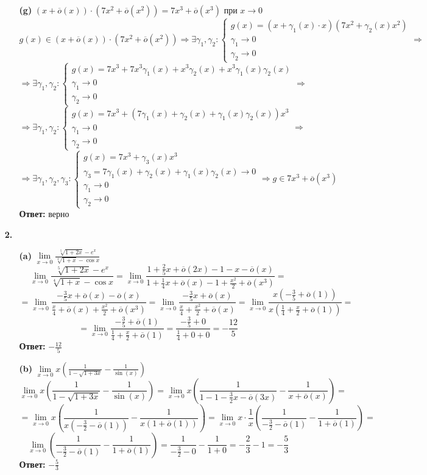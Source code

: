 \documentclass[a4paper]{article}
\renewcommand{\f}[2]{\frac{#1}{#2}}
\newcommand{\case}[1]{\begin{cases} #1 \end{cases}}
\newcommand{\lm}[1]{\underset{#1}{\lim}}
\renewcommand{\r}{\Rightarrow}
\newcommand{\oo}{\overline{o}}
\begin{document}
\begin{enumerate}
\begin{enumerate}
        \item[\textbf{(g)}]$ (x + \oo(x))\cdot (7x^2 + \oo(x^2)) = 7x^3 + \oo(x^3)$ при $x \to 0$
        $$g(x) \in (x + \oo(x))\cdot (7x^2 + \oo(x^2)) \r \exists \gamma_1, \gamma_2 : \case{
            g(x) = (x + \gamma_1(x)\cdot x)(7x^2 + \gamma_2(x)x^2)\\
            \gamma_1 \to 0 \\
            \gamma_2 \to 0
        } \r$$
        $$\r \exists \gamma_1, \gamma_2 : \case{
            g(x) = 7x^3 + 7x^3\gamma_1(x) + x^3\gamma_2(x) +x^3\gamma_1(x)\gamma_2(x) \\
            \gamma_1 \to 0 \\
            \gamma_2 \to 0
        }\r$$
        $$\r \exists \gamma_1, \gamma_2 : \case{
            g(x) = 7x^3 + (7\gamma_1(x) + \gamma_2(x) +\gamma_1(x)\gamma_2(x))x^3\\
            \gamma_1 \to 0 \\
            \gamma_2 \to 0
        }\r$$
        $$\r \exists \gamma_1, \gamma_2, \gamma_3 : \case{
            g(x) = 7x^3 + \gamma_3(x)x^3\\
            \gamma_3 = 7\gamma_1(x) + \gamma_2(x) +\gamma_1(x)\gamma_2(x) \to 0\\
            \gamma_1 \to 0 \\
            \gamma_2 \to 0
        } \r g \in 7x^3 + \oo(x^3)$$
        \textbf{Ответ: } верно\\
    \end{enumerate}
    
    \item[\textbf{2.}]
    \begin{enumerate}
        \item[\textbf{(a)}] $\lm{x\to 0}\f{\sqrt[5]{1+2x}-e^x}{\sqrt[4]{1+x}-\cos x}$
        $$\lm{x\to 0}\f{\sqrt[5]{1+2x}-e^x}{\sqrt[4]{1+x}-\cos x} = \lm{x\to 0}\f{1+\f{2}{5}x+\oo(2x)-1-x-\oo(x)}{1+\f{1}{4}x+\oo(x)-1+\f{x^2}{2}+\oo(x^3)} = $$
        $$ = \lm{x\to 0}\f{-\f{3}{5}x+\oo(x)-\oo(x)}{\f{x}{4}+\oo(x)+\f{x^2}{2}+\oo(x^3)} = \lm{x\to 0}\f{-\f{3}{5}x+\oo(x)}{\f{x}{4}+\f{x^2}{2}+\oo(x)} =\lm{x\to 0}\f{x(-\f{3}{5}+\oo(1))}{x(\f{1}{4}+\f{x}{2}+\oo(1))} =$$
        $$ = \lm{x\to 0}\f{-\f{3}{5}+\oo(1)}{\f{1}{4}+\f{x}{2}+\oo(1)} = \f{-\f{3}{5}+0}{\f{1}{4}+0+0} = -\f{12}{5}$$
        \textbf{Ответ: } $-\f{12}{5}$\\

        \item[\textbf{(b)}] $\lm{x \to 0}x\left( \f{1}{1 - \sqrt{1+3x}}-\f{1}{\sin(x)}\right)$
        $$\lm{x \to 0}x\left( \f{1}{1 - \sqrt{1+3x}}-\f{1}{\sin(x)}\right) = \lm{x \to 0}x\left( \f{1}{1 - 1-\f{3}{2}x - \oo(3x)}-\f{1}{x + \oo(x)}\right) = $$
        $$= \lm{x \to 0}x\left( \f{1}{x(-\f{3}{2} - \oo(1))}-\f{1}{x(1 + \oo(1))}\right)= \lm{x \to 0}x\cdot \f{1}{x}\left( \f{1}{-\f{3}{2} - \oo(1)}-\f{1}{1 + \oo(1)}\right) = $$
        $$\lm{x \to 0}\left( \f{1}{-\f{3}{2} - \oo(1)}-\f{1}{1 + \oo(1)}\right) = \f{1}{-\f{3}{2} - 0}-\f{1}{1 + 0}= -\f{2}{3}-1 = -\f{5}{3}$$
        \textbf{Ответ: } $-\f{5}{3}$\\


\end{enumerate}
\end{enumerate}
\end{document}
